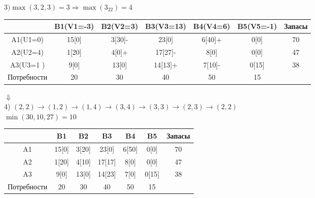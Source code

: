 \documentclass[a4paper, 12pt]{article}
\begin{document}
\begin{math}
  3) \max(3,2,3)= 3 \Rightarrow \max(3_{22}) = 4
\end{math}
\begin{table}[H]
\centering
\begin{tabular}{|c|c|c|c|c|c|c|}
\hline
            & B1(V1=-3)& B2(V2=3) & B3(V3=13) & B4(V4=6)  & B5(V5=-1) & Запасы \\ \hline
A1(U1=0)    & 15[0]    & 3[30]-   & 23[0]     & 6[40]+    & 0[0]      & 70     \\ \hline
A2(U2=4)    & 1[20]    & 4[0]+    & 17[27]-   & 8[0]      & 0[0]      & 47     \\ \hline
A3(U3=1 )   & 9[0]     & 13[0]    & 14[13]+   & 7[10]-    & 0[15]     & 38     \\ \hline
Потребности & 20       & 30       & 40        & 50        & 15        &        \\ \hline
\end{tabular}
\end{table}

\begin{center}
  $\Downarrow$\\
  4) $(2,2)\rightarrow(1,2)\rightarrow(1,4)\rightarrow(3,4)\rightarrow(3,3)\rightarrow(2,3)\rightarrow(2,2)$\\
  $\min(30,10,27) = 10$
\end{center}
\begin{table}[H]
\centering
\begin{tabular}{|c|c|c|c|c|c|c|}
\hline
     & B1       & B2       & B3        & B4        & B5        & Запасы \\ \hline
A1   & 15[0]    & 3[20]    & 23[0]     & 6[50]     & 0[0]      & 70     \\ \hline
A2   & 1[20]    & 4[10]    & 17[17]    & 8[0]      & 0[0]      & 47     \\ \hline
A3   & 9[0]     & 13[0]    & 14[23]    & 7[0]      & 0[15]     & 38     \\ \hline
Потребности & 20       & 30       & 40        & 50        & 15        &        \\ \hline
\end{tabular}
\end{table}
\end{document}
